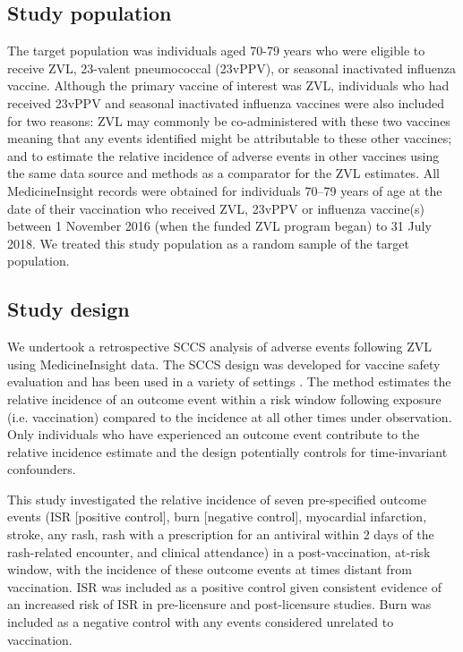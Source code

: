 \documentclass[review, endfloat]{elsarticle}
\begin{document}

\subsection{Study population}

The target population was individuals aged 70-79 years who were eligible to receive ZVL, 23-valent pneumococcal (23vPPV), or seasonal inactivated influenza vaccine. Although the primary vaccine of interest was ZVL, individuals who had received 23vPPV and seasonal inactivated influenza vaccines were also included for two reasons: ZVL may commonly be co-administered with these two vaccines meaning that any events identified might be attributable to these other vaccines; and to estimate the relative incidence of adverse events in other vaccines using the same data source and methods as a comparator for the ZVL estimates.  All MedicineInsight records were obtained for individuals 70–79 years of age at the date of their vaccination who received ZVL, 23vPPV or influenza vaccine(s) between 1 November 2016 (when the funded ZVL program began) to 31 July 2018. We treated this study population as a random sample of the target population. 

\subsection{Study design}

We undertook a retrospective SCCS analysis of adverse events following ZVL using MedicineInsight data. The SCCS design was developed for vaccine safety evaluation \citep{farrington1995} and has been used in a variety of settings \citep{buttery2011intussusception, bakken2015febrile, stowe2016risk}. The method estimates the relative incidence of an outcome event within a risk window following exposure (i.e. vaccination) compared to the incidence at all other times under observation. Only individuals who have experienced an outcome event contribute to the relative incidence estimate and the design potentially controls for time-invariant confounders.

This study investigated the relative incidence of seven pre-specified outcome events (ISR [positive control], burn [negative control], myocardial infarction, stroke, any rash, rash with a prescription for an antiviral within 2 days of the rash-related encounter, and clinical attendance) in a post-vaccination, at-risk window, with the incidence of these outcome events at times distant from vaccination. ISR was included as a positive control given consistent evidence of an increased risk of ISR in pre-licensure and post-licensure studies. Burn was included as a negative control with any events considered unrelated to vaccination.  
\end{document}
